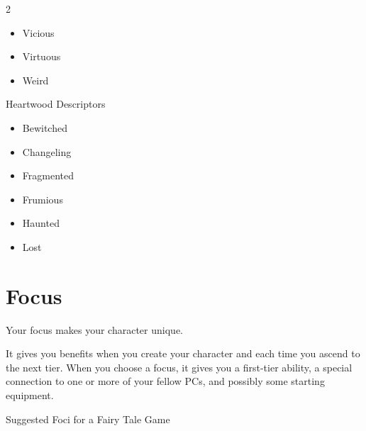 \begin{multicols}{2}
\begin{itemize}
\item Vicious
\item Virtuous
\item Weird
\end{itemize}
Heartwood Descriptors
\begin{itemize}
\item Bewitched 
\item Changeling
\item Fragmented 
\item Frumious
\item Haunted 
\item Lost
\end{itemize}

\section{Focus}

Your focus makes your character unique.

It gives you benefits when you create your character and each time you ascend to the next tier. When you choose a focus, it gives you a first-tier ability, a special connection to one or more of your fellow PCs, and possibly some starting equipment.

Suggested Foci for a Fairy Tale Game


\end{multicols}
